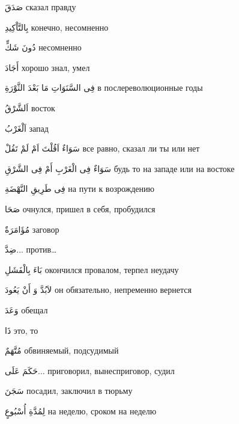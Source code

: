 \documentclass[a5paper]{article}
\newcommand\textstyleDropCaps[1]{#1}
\newcommand\textstyleCaptioncharacters[1]{#1}
\begin{document}
\textstyleCaptioncharacters{صَدَقَ }\textstyleDropCaps{сказал правду‎}

\textstyleCaptioncharacters{بِالتَّاْكِيدِ }\textstyleDropCaps{конечно, несо­мненно‎}

\textstyleCaptioncharacters{دُونَ شَكٍّ }\textstyleDropCaps{несомненно‎}

\textstyleCaptioncharacters{أَجَادَ }\textstyleDropCaps{хорошо знал, умел‎}

\textstyleCaptioncharacters{فِى السَّنَوَاتِ مَا بَعْدَ الثَّوْرَةِ }\textstyleDropCaps{в послереволюционные годы ‎}

\textstyleCaptioncharacters{اَلشَّرْقُ }\textstyleDropCaps{восток‎}

\textstyleCaptioncharacters{اَلْغَرْبُ }\textstyleDropCaps{запад‎}

\textstyleCaptioncharacters{سَوَاءٌ اَقُلْتَ اَمْ لَمْ تَقُلْ }\textstyleDropCaps{все равно, сказал ли ты или нет ‎}

\textstyleCaptioncharacters{سَوَاءٌ فِى الْغَرْبِ أَمْ فِى الشَّرْقِ }\textstyleDropCaps{будь то на западе или на востоке ‎}

\textstyleCaptioncharacters{فِى طَرِيقِ النَّهْضَةِ }\textstyleDropCaps{на пути к возрождению‎}

\textstyleCaptioncharacters{صَحَا }\textstyleDropCaps{очнулся, пришел в себя, пробудился‎}

\textstyleCaptioncharacters{مُؤَامَرَةٌ }\textstyleDropCaps{заговор‎}

\textstyleCaptioncharacters{ضِدَّ... }\textstyleDropCaps{против…‎}

\textstyleCaptioncharacters{بَاءَ بِالْفَشَلِ }\textstyleDropCaps{окончился провалом, терпел неудачу‎}

\textstyleCaptioncharacters{لاَبُدَّ وَ أَنْ يَعُودَ }\textstyleDropCaps{он обя­зательно, непременно вернется‎}

\textstyleCaptioncharacters{وَعَدَ }\textstyleDropCaps{обещал‎}

\textstyleCaptioncharacters{ذَا }\textstyleDropCaps{это, то‎}

\textstyleCaptioncharacters{مُتَّهَمٌ }\textstyleDropCaps{обвиняемый, подсу­димый‎}

\textstyleCaptioncharacters{حَكَمَ عَلَى... }\textstyleDropCaps{пригово­рил, вынесприговор, судил‎}

\textstyleCaptioncharacters{سَجَنَ }\textstyleDropCaps{посадил, заключил в тюрьму‎}

\textstyleCaptioncharacters{لِمُدَّةِ أُسْبُوعٍ }\textstyleDropCaps{на неде­лю, сроком на неделю‎}
\end{document}
